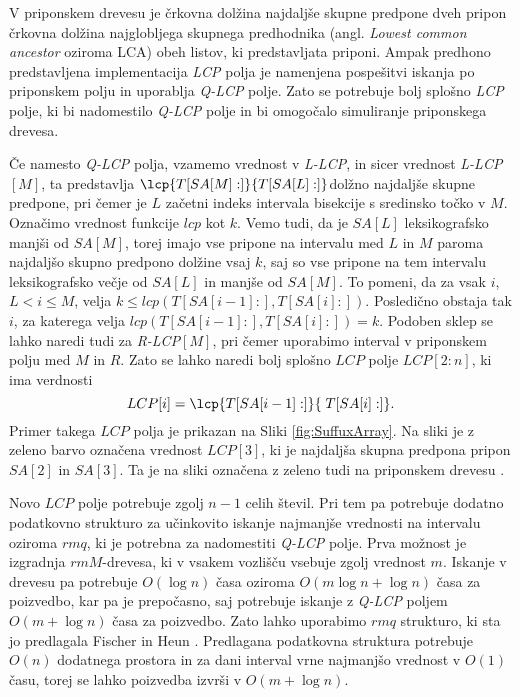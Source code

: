 V priponskem drevesu je črkovna dolžina najdaljše skupne predpone dveh pripon črkovna dolžina najglobljega skupnega predhodnika (angl. \textit{Lowest common ancestor} oziroma LCA) obeh listov, ki predstavljata priponi. Ampak predhono predstavljena implementacija \textit{LCP} polja je namenjena pospešitvi iskanja po priponskem polju in uporablja \textit{Q-LCP} polje. Zato se potrebuje bolj splošno \textit{LCP} polje, ki bi nadomestilo \textit{Q-LCP} polje in bi omogočalo simuliranje priponskega drevesa.

Če namesto \textit{Q-LCP} polja, vzamemo vrednost v \textit{L-LCP}, in sicer vrednost \textit{L-LCP}$[M]$, ta predstavlja $\lcp{T[SA[M]:]}{T[SA[L]:]}$dolžno najdaljše skupne predpone, pri čemer je $L$ začetni indeks intervala bisekcije s sredinsko točko v $M$. Označimo vrednost funkcije $lcp$ kot $k$. Vemo tudi, da je $SA[L]$ leksikografsko manjši od $SA[M]$, torej imajo vse pripone na intervalu med $L$ in $M$ paroma najdaljšo skupno predpono dolžine vsaj $k$, saj so vse pripone na tem intervalu leksikografsko večje od $SA[L]$ in manjše od $SA[M]$. To pomeni, da za vsak $i$, $L<i\le M$, velja $k\le lcp(T[SA[i-1]:], T[SA[i]:])$. Posledično obstaja tak $i$, za katerega velja $lcp(T[SA[i-1]:], T[SA[i]:])=k$. Podoben sklep se lahko naredi tudi za \textit{R-LCP}$[M]$, pri čemer uporabimo interval v priponskem polju med $M$ in $R$. Zato se lahko naredi bolj splošno $LCP$ polje $LCP[2:n]$, ki ima verdnosti 
$$
    LCP[i]=\lcp{T[SA[i-1]:]}{\; T[SA[i]:]}.
$$
Primer takega $LCP$ polja je prikazan na Sliki \ref{fig:SuffuxArray}. Na sliki je z zeleno barvo označena vrednost $LCP[3]$, ki je najdaljša skupna predpona pripon $SA[2]$ in $SA[3]$. Ta je na sliki označena z zeleno tudi na priponskem drevesu  \cite{Abouelhoda2004, Kasai2001}.

Novo $LCP$ polje potrebuje zgolj $n-1$ celih števil. Pri tem pa potrebuje dodatno podatkovno strukturo za učinkovito iskanje najmanjše vrednosti na intervalu oziroma $rmq$, ki je potrebna za nadomestiti \textit{Q-LCP} polje. Prva možnost je izgradnja $rmM$-drevesa, ki v vsakem vozlišču vsebuje zgolj vrednost $m$. Iskanje v drevesu pa potrebuje $O(\log{n})$ časa oziroma $O(m\log{n}+\log{n})$ časa za poizvedbo, kar pa je prepočasno, saj potrebuje iskanje z \textit{Q-LCP} poljem $O(m+\log{n})$ časa za poizvedbo. Zato lahko uporabimo $rmq$ strukturo, ki sta jo predlagala Fischer in Heun \cite{Fischer2007}. Predlagana podatkovna struktura potrebuje $O(n)$ dodatnega prostora in za dani interval vrne najmanjšo vrednost v $O(1)$ času, torej se lahko poizvedba izvrši v $O(m+\log{n})$.

